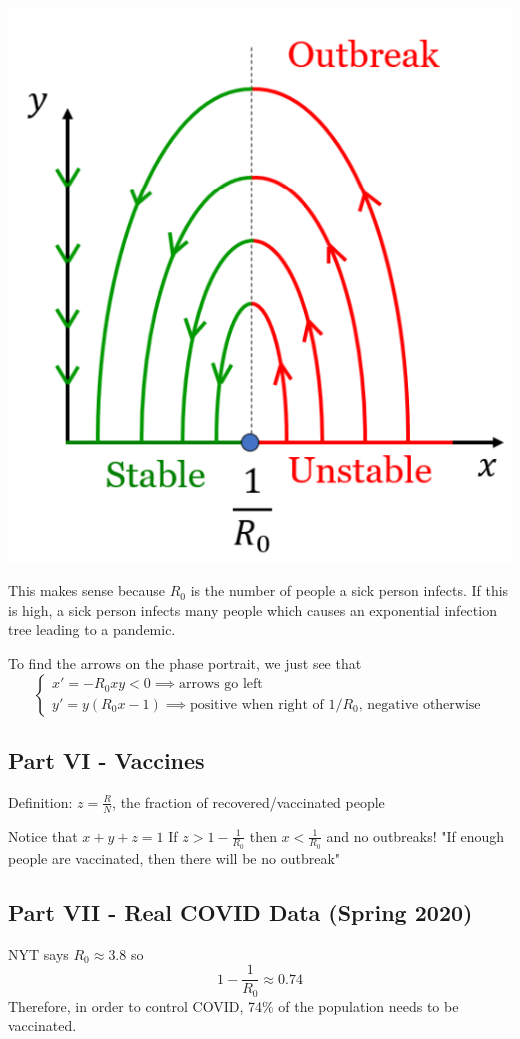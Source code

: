 \documentclass[12pt]{article}
\begin{document}
\includegraphics{Images/sir outbreak.png}

This makes sense because $R_0$ is the number of people a sick person infects. If this is high, a sick person infects many people which causes an exponential infection tree leading to a pandemic.

To find the arrows on the phase portrait, we just see that
\[\begin{cases}
    x' = -R_0 xy < 0 \implies  \text{arrows go left}\\
    y' = y(R_0 x - 1) \implies \text{positive when right of $1/R_0$, negative otherwise}
\end{cases}\]

\subsection*{Part VI - Vaccines}
Definition: $z = \frac{R}{N}$,  the fraction of recovered/vaccinated people 

Notice that $x + y + z = 1$ 
If $z > 1 - \frac{1}{R_0}$ then $x < \frac{1}{R_0}$ and no outbreaks!
"If enough people are vaccinated, then there will be no outbreak"

\subsection*{Part VII - Real COVID Data (Spring 2020)}
NYT says $R_0 \approx 3.8$ 
so 
\[1 - \frac{1}{R_0} \approx 0.74\]
Therefore, in order to control COVID, 74\% of the population needs to be vaccinated. 
\end{document}
